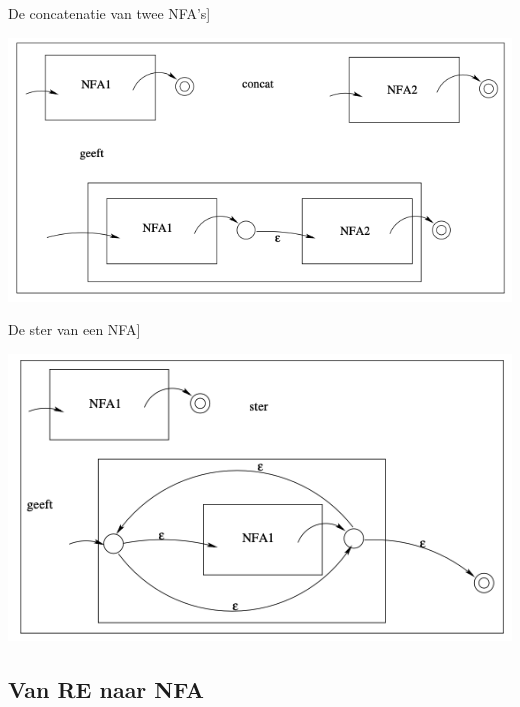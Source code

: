 \newpage

\begin{pro}{De concatenatie van twee NFA's]}
    \begin{center}
        \includegraphics[scale = 0.35]{Images/ConcatNFA}
    \end{center}
\end{pro}

\begin{pro}{De ster van een NFA]}
    \begin{center}
        \includegraphics[scale = 0.4]{Images/SterNFA}
    \end{center}
\end{pro}

\subsection{Van RE naar NFA}

\vspace{0.5cm}